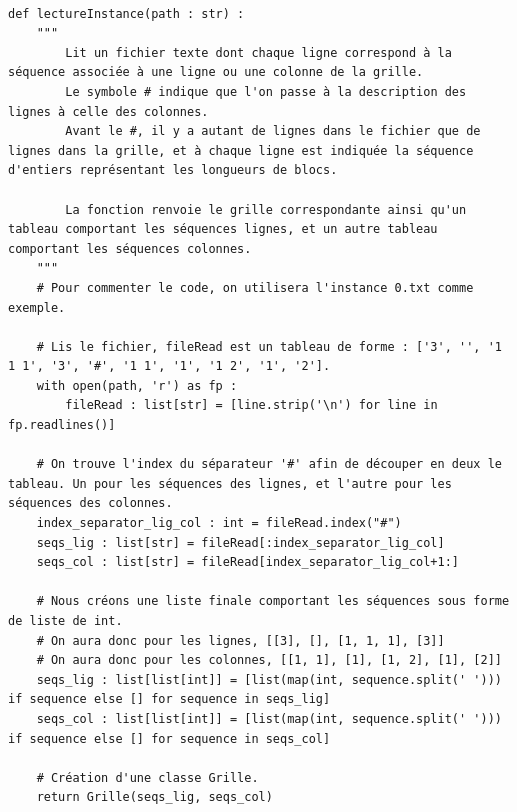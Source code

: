 \documentclass[a4paper,12pt]{article}
\begin{document}
\begin{lstlisting}

def lectureInstance(path : str) :
    """
        Lit un fichier texte dont chaque ligne correspond à la séquence associée à une ligne ou une colonne de la grille.
        Le symbole # indique que l'on passe à la description des lignes à celle des colonnes.
        Avant le #, il y a autant de lignes dans le fichier que de lignes dans la grille, et à chaque ligne est indiquée la séquence d'entiers représentant les longueurs de blocs.
        
        La fonction renvoie le grille correspondante ainsi qu'un tableau comportant les séquences lignes, et un autre tableau comportant les séquences colonnes.
    """
    # Pour commenter le code, on utilisera l'instance 0.txt comme exemple.
    
    # Lis le fichier, fileRead est un tableau de forme : ['3', '', '1 1 1', '3', '#', '1 1', '1', '1 2', '1', '2'].
    with open(path, 'r') as fp :
        fileRead : list[str] = [line.strip('\n') for line in fp.readlines()]
    
    # On trouve l'index du séparateur '#' afin de découper en deux le tableau. Un pour les séquences des lignes, et l'autre pour les séquences des colonnes.
    index_separator_lig_col : int = fileRead.index("#")
    seqs_lig : list[str] = fileRead[:index_separator_lig_col]
    seqs_col : list[str] = fileRead[index_separator_lig_col+1:]
    
    # Nous créons une liste finale comportant les séquences sous forme de liste de int.
    # On aura donc pour les lignes, [[3], [], [1, 1, 1], [3]]
    # On aura donc pour les colonnes, [[1, 1], [1], [1, 2], [1], [2]]
    seqs_lig : list[list[int]] = [list(map(int, sequence.split(' '))) if sequence else [] for sequence in seqs_lig]
    seqs_col : list[list[int]] = [list(map(int, sequence.split(' '))) if sequence else [] for sequence in seqs_col]

    # Création d'une classe Grille.   
    return Grille(seqs_lig, seqs_col)
\end{lstlisting}

\newpage
\end{document}
